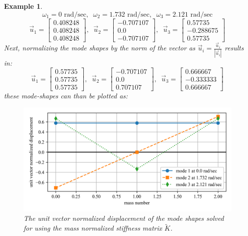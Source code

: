 \documentclass[12pt,letter]{article}
\newtheorem{ex}{Example}
\numberwithin{ex}{section} %
\newenvironment{example}{\begin{mdframed}[middlelinewidth=0.5mm]\begin{ex}\normalfont}{\end{ex}\end{mdframed}}
\numberwithin{re}{section} %
\begin{document}
\begin{example}
\begin{equation}
\omega_1 = 0  \text{ rad/sec}, \; \; \omega_2 = 1.732 \text{ rad/sec}, \; \; \omega_3 = 2.121  \text{ rad/sec}
\end{equation}
\begin{equation}
\vec{u}_1 = \begin{bmatrix} 0.408248 \\    0.408248 \\    0.408248  \end{bmatrix}, \; \; \vec{u}_2 = \begin{bmatrix} -0.707107 \\    0.0 \\    -0.707107 \end{bmatrix}, \; \; \vec{u}_3 = \begin{bmatrix} 0.57735 \\    -0.288675 \\    0.57735  \end{bmatrix}
\end{equation}
Next, normalizing the mode shapes by the norm of the vector as $\vec{u}_i = \frac{\vec{u}_i}{|\vec{u}_i|}$ results in:
\begin{equation}
\vec{u}_1 = \begin{bmatrix} 0.57735 \\    0.57735 \\    0.57735  \end{bmatrix}, \; \; \vec{u}_2 = \begin{bmatrix} -0.707107 \\    0.0 \\    0.707107 \end{bmatrix}, \; \; \vec{u}_3 = \begin{bmatrix} 0.666667 \\    -0.333333 \\    0.666667  \end{bmatrix}
\end{equation}
these mode-shapes can than be plotted as:
\begin{figure}[H]
	\centering
	\includegraphics[width=\linewidth]{../Figures/mode_shape_aiplane_example_normalized_stiffness.png}
	\caption{The unit vector normalized displacement of the mode shapes solved for using the mass normalized stiffness matrix $\tilde{K}$.}
	\label{fig:mode_shape_aiplane_example_normalized_stiffness}
\end{figure}




\end{example}
\end{document}
